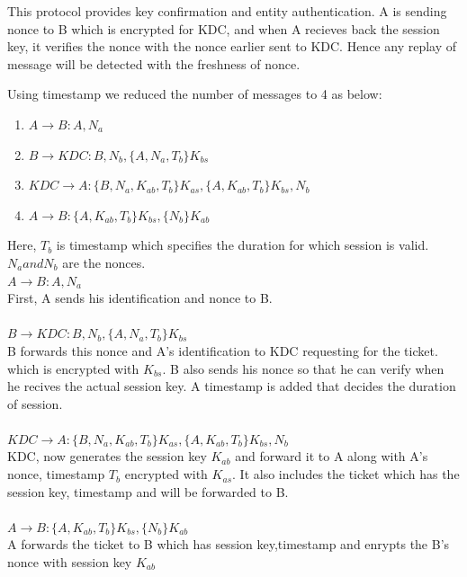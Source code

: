 \documentclass{article}
\begin{document}
 This protocol provides key confirmation and entity authentication. A is sending nonce to B which is encrypted for KDC, and when A recieves back the session key, it verifies the nonce with the nonce earlier sent to KDC. Hence any replay of message will be detected with the freshness of nonce.
 
 
    
\vspace{1cm}
\noindent Using timestamp we reduced the number of messages to 4 as below: \\
 \begin{enumerate}
  \item $A \rightarrow B: A,N_a$
  \item	$B \rightarrow KDC: B,N_b,\{A,N_a,T_b\}K_{bs}$
  \item $KDC \rightarrow A: \{B,N_a,K_{ab},T_b\}K_{as}, \{A,K_{ab},T_b\}K_{bs},N_b$
  \item $A \rightarrow B: \{A,K_{ab},T_b\}K_{bs}, \{N_b\}K_{ab}$
 \end{enumerate} 
 
 \noindent Here, $T_b$ is timestamp which specifies the duration for which session is valid. \\ 
 \indent $N_a and N_b$ are the nonces. \\
 
 
 \noindent 
 $A \rightarrow B: A,N_a$ \\ First, A sends his identification and nonce to B.\\ \\
 $B \rightarrow KDC: B,N_b,\{A,N_a,T_b\}K_{bs}$\\ B forwards this nonce and A's identification to KDC requesting for the ticket.
 which is encrypted with $K_{bs}$. B also sends his nonce so that he can verify when he recives the actual session key. 
 A timestamp is added that decides the duration of session. \\ \\
 $KDC \rightarrow A: \{B,N_a,K_{ab},T_b\}K_{as}, \{A,K_{ab},T_b\}K_{bs},N_b$ \\
 KDC, now generates the session key $K_{ab}$ and forward it to A along with A's nonce, timestamp $T_b$ encrypted with $K_{as}$.
 It also includes the ticket which has the session key, timestamp and will be forwarded to B. \\ \\
 $A \rightarrow B: \{A,K_{ab},T_b\}K_{bs}, \{N_b\}K_{ab}$ \\
 A forwards the ticket to B which has session key,timestamp and enrypts the B's nonce with session key $K_{ab}$ \\
 
\end{document}
